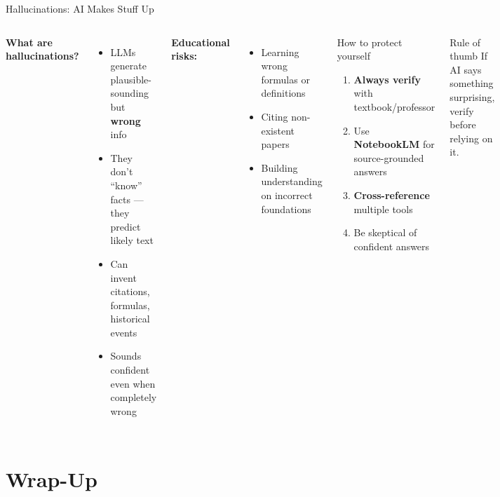 \documentclass[aspectratio=169]{beamer}
\begin{document}
\begin{frame}{Hallucinations: AI Makes Stuff Up}
\small
\begin{columns}[T]
\textbf{\color{warnred}What are hallucinations?}
\begin{itemize}\setlength\itemsep{0em}
  \item LLMs generate plausible-sounding but \textbf{wrong} info
  \item They don't ``know'' facts --- they predict likely text
  \item Can invent citations, formulas, historical events
  \item Sounds confident even when completely wrong
\end{itemize}

\smallskip
\textbf{\color{warnred}Educational risks:}
\begin{itemize}\setlength\itemsep{0em}
  \item Learning wrong formulas or definitions
  \item Citing non-existent papers
  \item Building understanding on incorrect foundations
\end{itemize}

\begin{alertblock}{How to protect yourself}
\begin{enumerate}\setlength\itemsep{0em}
  \item \textbf{Always verify} with textbook/professor
  \item Use \textbf{NotebookLM} for source-grounded answers
  \item \textbf{Cross-reference} multiple tools
  \item Be skeptical of confident answers
\end{enumerate}
\end{alertblock}

\smallskip
\begin{exampleblock}{Rule of thumb}
If AI says something surprising, verify before relying on it.
\end{exampleblock}
\end{columns}
\end{frame}

\section{Wrap-Up}
\end{document}
